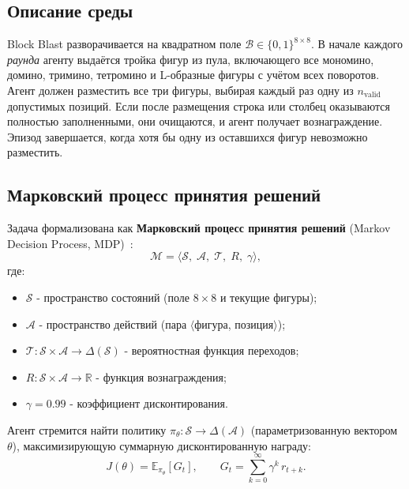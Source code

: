 \documentclass[12pt, a4paper]{article}
\newcommand{\R}{\mathbb{R}}
\begin{document}
\subsection{Описание среды}

Block Blast разворачивается на квадратном поле $\mathcal{B} \in \{0, 1\}^{8 \times 8}$. В начале каждого \textit{раунда} агенту выдаётся тройка фигур из пула, включающего все мономино, домино, тримино, тетромино и L-образные фигуры с учётом всех поворотов. Агент должен разместить все три фигуры, выбирая каждый раз одну из $n_{\text{valid}}$ допустимых позиций. Если после размещения строка или столбец оказываются полностью заполненными, они очищаются, и агент получает вознаграждение. Эпизод завершается, когда хотя бы одну из оставшихся фигур невозможно разместить.

\subsection{Марковский процесс принятия решений}

Задача формализована как \textbf{Марковский процесс принятия решений} (Markov Decision Process, MDP)~\cite{sutton2018}:
\begin{equation}
  \mathcal{M} = \langle \mathcal{S},\; \mathcal{A},\; \mathcal{T},\; R,\; \gamma \rangle,
\end{equation}
где:
\begin{itemize}
  \item $\mathcal{S}$ - пространство состояний (поле $8\times 8$ и текущие фигуры);
  \item $\mathcal{A}$ - пространство действий (пара $\langle$фигура, позиция$\rangle$);
  \item $\mathcal{T}: \mathcal{S} \times \mathcal{A} \to \Delta(\mathcal{S})$ - вероятностная функция переходов;
  \item $R: \mathcal{S} \times \mathcal{A} \to \R$ - функция вознаграждения;
  \item $\gamma = 0.99$ - коэффициент дисконтирования.
\end{itemize}

Агент стремится найти политику $\pi_\theta: \mathcal{S} \to \Delta(\mathcal{A})$ (параметризованную вектором $\theta$), максимизирующую суммарную дисконтированную награду:
\begin{equation}
  J(\theta) = \mathbb{E}_{\pi_\theta}\!\left[G_t\right],
  \qquad
  G_t = \sum_{k=0}^{\infty} \gamma^k\, r_{t+k}.
\end{equation}
\end{document}

